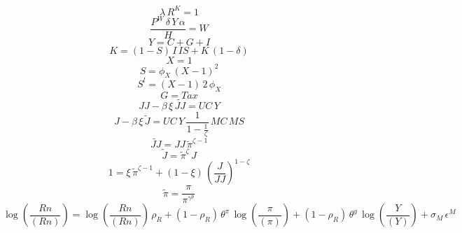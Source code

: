 \begin{dmath}
{\lambda}\, {R^{K}}=1
\end{dmath}
\begin{dmath}
\frac{{P^{W}}\, {\delta}\, {Y}\, {{\alpha}}}{{H}}={W}
\end{dmath}
\begin{dmath}
{Y}={C}+{G}+{I}
\end{dmath}
\begin{dmath}
{K}=\left(1-{S}\right)\, {I}\, {IS}+{K}\, \left(1-{{\delta}}\right)
\end{dmath}
\begin{dmath}
{X}=1
\end{dmath}
\begin{dmath}
{S}={{\phi_{X}}}\, \left({X}-1\right)^{2}
\end{dmath}
\begin{dmath}
{S^{l}}=\left({X}-1\right)\, 2\, {{\phi_{X}}}
\end{dmath}
\begin{dmath}
{G}={Tax}
\end{dmath}
\begin{dmath}
{JJ}-{{\beta}}\, {{\xi}}\, {\tilde{JJ}}={UC}\, {Y}
\end{dmath}
\begin{dmath}
{J}-{{\beta}}\, {{\xi}}\, {\tilde{J}}={UC}\, {Y}\, \frac{1}{1-\frac{1}{{{\zeta}}}}\, {MC}\, {MS}
\end{dmath}
\begin{dmath}
{\tilde{JJ}}={JJ}\, {\tilde{\pi}}^{{{\zeta}}-1}
\end{dmath}
\begin{dmath}
{\tilde{J}}={\tilde{\pi}}^{{{\zeta}}}\, {J}
\end{dmath}
\begin{dmath}
1={{\xi}}\, {\tilde{\pi}}^{{{\zeta}}-1}+\left(1-{{\xi}}\right)\, \left(\frac{{J}}{{JJ}}\right)^{1-{{\zeta}}}
\end{dmath}
\begin{dmath}
{\tilde{\pi}}=\frac{{\pi}}{{\pi}^{{{\gamma^{p}}}}}
\end{dmath}
\begin{dmath}
\log\left(\frac{{Rn}}{({Rn})}\right)=\log\left(\frac{{Rn}}{({Rn})}\right)\, {{\rho_{R}}}+\left(1-{{\rho_{R}}}\right)\, {\theta^{\pi}}\, \log\left(\frac{{\pi}}{({\pi})}\right)+\left(1-{{\rho_{R}}}\right)\, {\theta^{y}}\, \log\left(\frac{{Y}}{({Y})}\right)+{{\sigma_{M}}}\, {{\epsilon^{M}}}
\end{dmath}
